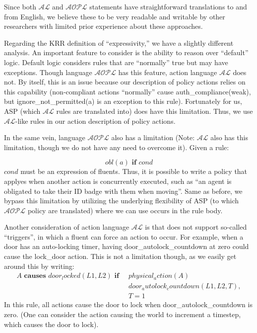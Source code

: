Since both $\mathcal{AL}$ and $\mathcal{AOPL}$ statements have straightforward translations to and from English, we believe these to be very readable and writable by other researchers with limited prior experience about these approaches.

Regarding the KRR definition of ``expressivity,'' we have a slightly different analysis.
An important feature to consider is the ability to reason over ``default'' logic.
Default logic considers rules that are ``normally'' true but may have exceptions.
Though language $\mathcal{AOPL}$ has this feature, action language $\mathcal{AL}$ does not.
By itself, this is an issue because our description of policy actions relies on this capability (non-compliant actions ``normally'' cause \neg auth_compliance(weak), but ignore_not_permitted(a) is an exception to this rule).
Fortunately for us, ASP (which $\mathcal{AL}$ rules are translated into) does have this limitation.
Thus, we use $\mathcal{AL}$-like rules in our action description of policy actions.

In the same vein, language $\mathcal{AOPL}$ also has a limitation (Note: $\mathcal{AL}$ also has this limitation, though we do not have any need to overcome it).
Given a rule:

\begin{equation}
    obl(a) \textbf{ if } cond
\end{equation}
$cond$ must be an expression of fluents.
Thus, it is possible to write a policy that applyes when another action is concurrently executed, such as ``an agent is obligated to take their ID badge with them when moving''.
Same as before, we bypass this limitation by utilizing the underlying flexibility of ASP (to which $\mathcal{AOPL}$ policy are translated) where we can use occurs in the rule body.

Another consideration of action language $\mathcal{AL}$ is that does not support so-called ``triggers'', in which a fluent can force an action to occur.
For example, when a door has an auto-locking timer, having door\_autolock\_countdown at zero could cause the lock\_door action.
This is not a limitation though, as we easily get around this by writing:
\begin{equation}
\begin{split}
    A \textbf{ causes } door_locked(L1, L2) \textbf{ if } \
        & physical_action(A) \\
        & door_autolock_countdown(L1, L2, T), \\
        & T = 1
\end{split}
\end{equation}
In this rule, all actions cause the door to lock when door\_autolock\_countdown is zero.
(One can consider the action causing the world to increment a timestep, which causes the door to lock).

